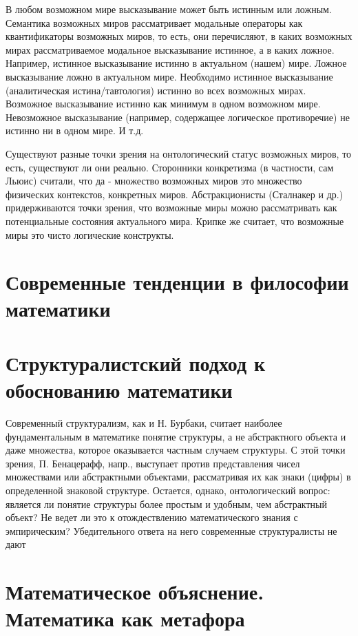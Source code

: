 \documentclass[12pt, specialist, subf, substylefile = spbu.rtx]{disser}
\begin{document}
В любом возможном мире высказывание может быть истинным или ложным. Семантика возможных миров рассматривает модальные операторы как квантификаторы возможных миров, то есть, они перечисляют, в каких возможных мирах рассматриваемое модальное высказывание истинное, а в каких ложное. Например, истинное высказывание истинно в актуальном (нашем) мире. Ложное высказывание ложно в актуальном мире. Необходимо истинное высказывание (аналитическая истина/тавтология) истинно во всех возможных мирах. Возможное высказывание истинно как минимум в одном возможном мире. Невозможное высказывание (например, содержащее логическое противоречие) не истинно ни в одном мире. И т.д.

Существуют разные точки зрения на онтологический статус возможных миров, то есть, существуют ли они реально. Сторонники конкретизма (в частности, сам Льюис) считали, что да - множество возможных миров это множество физических контекстов, конкретных миров. Абстракционисты (Сталнакер и др.) придерживаются точки зрения, что возможные миры можно рассматривать как потенциальные состояния актуального мира. Крипке же считает, что возможные миры это чисто логические конструкты.


\section{Современные тенденции в философии математики}
\section{Структуралистский подход к обоснованию математики}
Современный структурализм, как и Н. Бурбаки, считает наиболее фундаментальным в математике понятие структуры, а не абстрактного объекта и даже множества, которое оказывается частным случаем структуры. С этой точки зрения, П. Бенацерафф, напр., выступает против представления чисел множествами или абстрактными объектами, рассматривая их как знаки (цифры) в определенной знаковой структуре. Остается, однако, онтологический вопрос: является ли понятие структуры более простым и удобным, чем абстрактный объект? Не ведет ли это к отождествлению математического знания с эмпирическим? Убедительного ответа на него современные структуралисты не дают
\section{Математическое объяснение. Математика как метафора}
\end{document}
